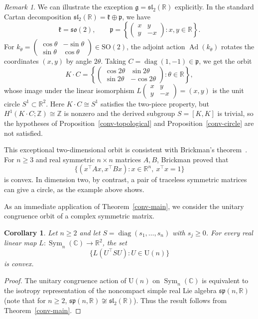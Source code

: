 \documentclass[11pt,reqno]{amsart}
\newtheorem{corollary}[theorem]{Corollary}
\theoremstyle{remark}
\newtheorem{remark}[theorem]{Remark}
\newcommand{\R}{\mathbb R}
\newcommand{\C}{\mathbb C}
\newcommand{\Z}{\mathbb Z}
\newcommand{\gfr}{\mathfrak g}
\newcommand{\kfr}{\mathfrak k}
\newcommand{\pfr}{\mathfrak p}
\newcommand{\UU}{\mathrm U}
\DeclareMathOperator{\Sym}{Sym}
\begin{document}
\begin{remark}\label{conv-sl2-explanation}
We can illustrate the exception $\gfr=\mathfrak{sl}_2(\R)$ explicitly.
In the standard Cartan decomposition $\mathfrak{sl}_2(\R)=\kfr\oplus\pfr$,
we have
\[
 \kfr=\mathfrak{so}(2),\qquad
 \pfr=\left\{
 \begin{pmatrix}x&y\\y&-x\end{pmatrix}:x,y\in\R
 \right\}.
\]
For
$k_\theta=\left(\begin{smallmatrix}\cos\theta&-\sin\theta\\
\sin\theta&\cos\theta\end{smallmatrix}\right)\in\mathrm{SO}(2)$,
the adjoint action $\operatorname{Ad}(k_\theta)$ rotates the coordinates
$(x,y)$ by angle $2\theta$. Taking $C=\operatorname{diag}(1,-1)\in\pfr$,
we get the orbit
\[
 K\cdot C=
 \left\{\begin{pmatrix}
 \cos2\theta&\sin2\theta\\
 \sin2\theta&-\cos2\theta
 \end{pmatrix}:\theta\in\R\right\},
\]
whose image under the linear isomorphism
$L\left(\begin{smallmatrix}x&y\\y&-x\end{smallmatrix}\right)=(x,y)$ is
the unit circle $S^1\subset\R^2$. Here $K\cdot C\cong S^1$ satisfies the
two-piece property, but $H^1(K\cdot C;\Z)\cong\Z$ is nonzero and the
derived subgroup $S=[K,K]$ is trivial, so the hypotheses of
Proposition~\ref{conv-topological} and Proposition~\ref{conv-circle} are
not satisfied.

This exceptional two-dimensional orbit is consistent with Brickman's
theorem~\cite{Brickman1961}. For $n\ge3$ and real symmetric $n\times n$
matrices $A,B$, Brickman proved that
\[
 \{(x^{\top}Ax,x^{\top}Bx):x\in\R^n,\ x^{\top}x=1\}
\]
is convex. In dimension two, by contrast, a pair of traceless symmetric
matrices can give a circle, as the example above shows.
\end{remark}

As an immediate application of Theorem~\ref{conv-main}, we consider the
unitary congruence orbit of a complex symmetric matrix.

\begin{corollary}\label{conv-symmetric}
Let $n\ge2$ and let $S=\operatorname{diag}(s_1,\ldots,s_n)$ with
$s_j\ge0$. For every real linear map $L:\Sym_n(\C)\to\R^2$, the set
\[
 \{L(U^{\top}SU):U\in\UU(n)\}
\]
is convex.
\end{corollary}
\begin{proof}
The unitary congruence action of $\UU(n)$ on $\Sym_n(\C)$ is
equivalent to the isotropy representation of the noncompact simple real
Lie algebra $\mathfrak{sp}(n,\R)$ (note that for $n\ge2$,
$\mathfrak{sp}(n,\R)\not\cong\mathfrak{sl}_2(\R)$). Thus the result
follows from Theorem~\ref{conv-main}.
\end{proof}
\end{document}
